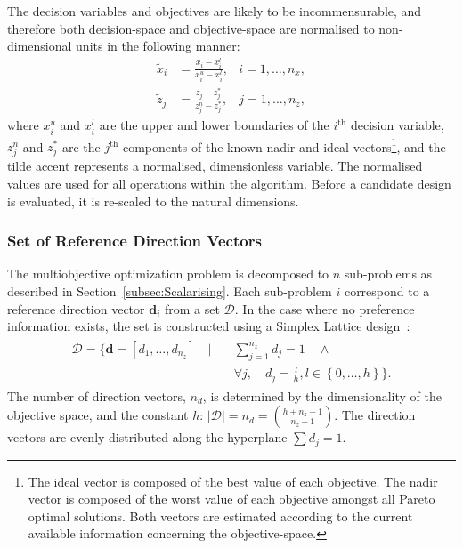 \documentclass[10pt]{llncs}
\newcommand{\brs}[1]{\left[{#1}\right]} %
\newcommand{\brf}[1]{\left\lbrace{#1}\right\rbrace} %
\newcommand{\vd}{\mathbf{d}} %
\newcommand{\DSet}{\mathcal{D}} %
\begin{document}
The decision variables and objectives are likely to be incommensurable, and therefore both decision-space and objective-space are normalised to non-dimensional units in the following manner:
\begin{align}
	\tilde{x}_i &= \frac{x_i - x^l_i}{x^u_i - x^l_i} , &i=1,\ldots,n_x,\\
	\tilde{z}_j &= \frac{z_j - z^*_j}{z^n_j - z^*_j} , &j=1,\ldots,n_z,
\end{align}
where $x^u_i$ and $x^l_i$ are the upper and lower boundaries of the $i^\text{th}$ decision variable, $z^n_j$ and $z^*_j$ are the $j^\text{th}$ components of the known nadir and ideal vectors\footnote{The ideal vector is composed of the best value of each objective.
The nadir vector is composed of the worst value of each objective amongst all Pareto optimal solutions.
Both vectors are estimated according to the current available information concerning the objective-space.}, and the tilde accent represents a normalised, dimensionless variable.
The normalised values are used for all operations within the algorithm.
Before a candidate design is evaluated, it is re-scaled to the natural dimensions.

\subsubsection{Set of Reference Direction Vectors}
The multiobjective optimization problem is decomposed to $n$ sub-problems as described in Section~\ref{subsec:Scalarising}. Each sub-problem $i$ correspond to a reference direction vector $\vd_i$ from a set $\DSet$. In the case where no preference information exists, the set is constructed using a Simplex Lattice design~\cite{Scheffe1958Experiments}:
\begin{align}
	\label{eq:SimplexLattice}
	\begin{split}
		\DSet = \Biggl\lbrace\vd=\brs{d_1,\ldots,d_{n_z}}\quad \vert \quad &\sum_{j=1}^{n_z} d_j = 1 \quad \wedge \\
		& \forall j, \quad d_j = \frac{l}{h}, l\in\brf{0,\ldots,h} \Biggr\rbrace.
	\end{split}
\end{align}
The number of direction vectors, $n_d$, is determined by the dimensionality of the objective space, and the constant $h$: $\vert\DSet\vert = n_d = \binom{h+n_z-1}{n_z-1}$. The direction vectors are evenly distributed along the hyperplane $\sum d_j = 1$.
\end{document}
